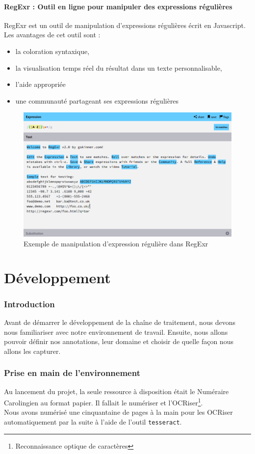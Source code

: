 \documentclass[a4paper, 11pt]{report}
\begin{document}
\subsection{RegExr : Outil en ligne pour manipuler des expressions régulières}
RegExr est un outil de manipulation d’expressions régulières écrit en Javascript.
Les avantages de cet outil sont : 
\begin{itemize}
\item la coloration syntaxique,
\item la visualisation temps réel du résultat dans un texte personnalisable,
\item l'aide appropriée
\item une communauté partageant ses expressions régulières
\end{itemize}
\begin{figure}[h]
\begin{center}
\includegraphics[scale=0.3]{img/regexr.png} 
\end{center}
\caption{Exemple de manipulation d'expression régulière dans RegExr}
\end{figure}
\part{Développement}
    \section*{Introduction}
    Avant de démarrer le développement de la chaîne de traitement, nous devons nous familiariser avec notre environnement de travail. Ensuite, nous allons pouvoir définir nos annotations, leur domaine et choisir de quelle façon nous allons les capturer.
    \section{Prise en main de l'environnement}
    Au lancement du projet, la seule ressource à disposition était le Numéraire Carolingien au format papier. Il fallait le numériser et l'OCRiser\footnote{Reconnaissance optique de caractères}.\\
    Nous avons numérisé une cinquantaine de pages à la main pour les OCRiser automatiquement par la suite à l'aide de l'outil \texttt{tesseract}.\\
\end{document}
